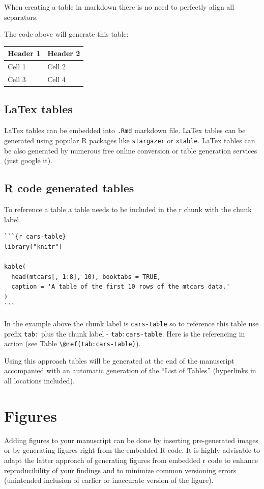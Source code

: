 \documentclass[]{book}
\begin{document}
When creating a table in markdown there is no need to perfectly align
all separators.

The code above will generate this table:

\begin{longtable}[]{@{}ll@{}}
\toprule
Header 1 & Header 2\tabularnewline
\midrule
\endhead
Cell 1 & Cell 2\tabularnewline
Cell 3 & Cell 4\tabularnewline
\bottomrule
\end{longtable}

\subsection{LaTex tables}\label{latex-tables}

LaTex tables can be embedded into \texttt{.Rmd} markdown file. LaTex
tables can be generated using popular R packages like \texttt{stargazer}
or \texttt{xtable}. LaTex tables can be also generated by numerous free
online conversion or table generation services (just google it).

\subsection{R code generated tables}\label{r-code-generated-tables}

To reference a table a table needs to be included in the r chunk with
the chunk label.

\begin{verbatim}
```{r cars-table}
library("knitr")

kable(
  head(mtcars[, 1:8], 10), booktabs = TRUE,
  caption = 'A table of the first 10 rows of the mtcars data.'
)
```
\end{verbatim}

In the example above the chunk label is \texttt{cars-table} so to
reference this table use prefix \texttt{tab:} plus the chunk label -
\texttt{tab:cars-table}. Here is the referencing in action (see Table
\texttt{\textbackslash{}@ref(tab:cars-table)}).

Using this approach tables will be generated at the end of the
manuscript accompanied with an automatic generation of the ``List of
Tables'' (hyperlinks in all locations included).

\section{Figures}\label{figures}

Adding figures to your manuscript can be done by inserting pre-generated
images or by generating figures right from the embedded R code. It is
highly advisable to adapt the latter approach of generating figures from
embedded r code to enhance reproducibility of your findings and to
minimize common versioning errors (unintended inclusion of earlier or
inaccurate version of the figure).
\end{document}
